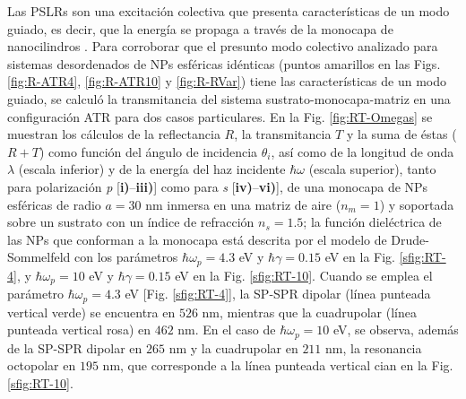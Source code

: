 Las PSLRs son una excitación colectiva que presenta características de un modo guiado, es decir, que la energía se propaga a través de la monocapa de nanocilindros \cite{kabashin2009plasmonic}. Para corroborar que el presunto modo colectivo analizado para sistemas desordenados de NPs esféricas idénticas (puntos amarillos en las Figs. \ref{fig:R-ATR4}, \ref{fig:R-ATR10} y \ref{fig:R-RVar}) tiene las características de un modo guiado, se calculó la transmitancia del sistema sustrato-monocapa-matriz en una configuración ATR para dos casos particulares. En la Fig. \ref{fig:RT-Omegas} se muestran los cálculos de la reflectancia $R$, la transmitancia $T$ y la suma de éstas ($R+T$) como función del ángulo de incidencia $\theta_i$, así como de la longitud de onda $\lambda$ (escala inferior) y de la energía del haz incidente $\hbar\omega$ (escala superior), tanto para polarización \emph{p}  [\textbf{i)}--\textbf{iii)}] como para \emph{s} [\textbf{iv)}--\textbf{vi)}], de una monocapa de NPs esféricas de radio $a = 30$ nm inmersa en una matriz de aire ($n_m = 1$) y soportada sobre un sustrato con un índice de refracción $n_s = 1.5$; la función dieléctrica de las NPs que conforman a la monocapa está descrita por el modelo de Drude-Sommelfeld con los parámetros $\hbar\omega_p = 4.3$ eV y $\hbar\gamma = 0.15$ eV en la Fig. \ref{sfig:RT-4}, y $\hbar\omega_p = 10$ eV y $\hbar\gamma=0.15$ eV en la Fig. \ref{sfig:RT-10}. Cuando se emplea el parámetro $\hbar\omega_p = 4.3$ eV [Fig. \ref{sfig:RT-4}], la SP-SPR dipolar  (línea punteada vertical verde) se encuentra en $526$ nm, mientras que la cuadrupolar (línea punteada vertical rosa)  en $462$ nm. En el caso de $\hbar\omega_p=10$ eV, se observa, además de  la SP-SPR dipolar en $265$ nm y la cuadrupolar en $211$ nm, la resonancia octopolar en $195$ nm, que corresponde a la línea punteada vertical cian en la Fig. \ref{sfig:RT-10}.


